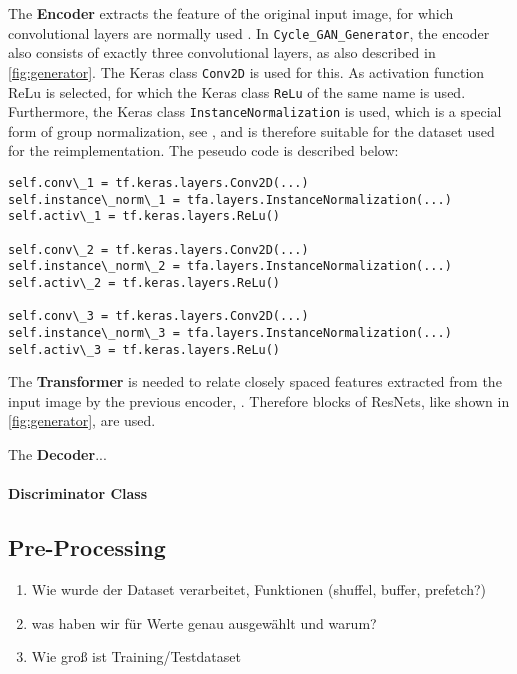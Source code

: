 \documentclass[fleqn,10pt]{SelfArx} %
\begin{document}
The \textbf{Encoder} extracts the feature of the original input image, for which convolutional layers are normally used \cite{Introduction-to-Cycle-GANs}. In \texttt{Cycle\_GAN\_Generator}, the encoder also consists of exactly three convolutional layers, as also described in \autoref{fig:generator}. The Keras class \texttt{Conv2D} is used for this. As activation function \ac{ReLu} is selected, for which the Keras class \texttt{ReLu} of the same name is used. Furthermore, the Keras class \texttt{InstanceNormalization} is used, which is a special form of group normalization, see \cite{google-tf-InstanceNormalization}, and is therefore suitable for the dataset used for the reimplementation. The peseudo code is described below:
\begin{lstlisting}
self.conv\_1 = tf.keras.layers.Conv2D(...)
self.instance\_norm\_1 = tfa.layers.InstanceNormalization(...)
self.activ\_1 = tf.keras.layers.ReLu()

self.conv\_2 = tf.keras.layers.Conv2D(...)
self.instance\_norm\_2 = tfa.layers.InstanceNormalization(...)
self.activ\_2 = tf.keras.layers.ReLu()

self.conv\_3 = tf.keras.layers.Conv2D(...)
self.instance\_norm\_3 = tfa.layers.InstanceNormalization(...)
self.activ\_3 = tf.keras.layers.ReLu()
\end{lstlisting}

The \textbf{Transformer} is needed to relate closely spaced features extracted from the input image by the previous encoder, \cite{Introduction-to-Cycle-GANs}. Therefore blocks of \acp{ResNet}, like shown in \autoref{fig:generator}, are used.


The \textbf{Decoder}...


\paragraph{Discriminator Class}

\subsection{Pre-Processing} 
\begin{enumerate}[noitemsep] %
	\item Wie wurde der Dataset verarbeitet, Funktionen (shuffel, buffer, prefetch?)
	\item was haben wir für Werte genau ausgewählt und warum?
	\item Wie groß ist Training/Testdataset
\end{enumerate}
\end{document}
